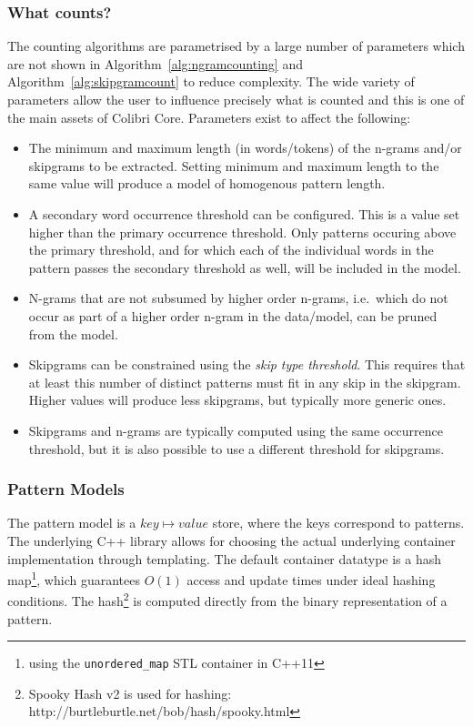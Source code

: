 \documentclass[a4paper,12pt]{article}
\begin{document}
\subsubsection{What counts?}
\label{sec:whatcounts}

The counting algorithms are parametrised by a large number of parameters which
are not shown in Algorithm~\ref{alg:ngramcounting} and
Algorithm~\ref{alg:skipgramcount} to reduce complexity. The wide variety of
parameters allow the user to influence precisely what is counted and this is one
of the main assets of Colibri Core. Parameters exist to affect the following:

\begin{itemize}
    \item The minimum and maximum length (in words/tokens) of the n-grams
        and/or skipgrams to be extracted. Setting minimum and maximum length to
        the same value will produce a model of homogenous pattern length.
    \item A secondary word occurrence threshold can be configured. This is a value set higher than
        the primary occurrence threshold. Only patterns
        occuring above the primary threshold, and for which each of the
        individual words in the pattern passes the secondary threshold as well, will
        be included in the model.
    \item N-grams that are not subsumed by higher order n-grams, i.e.\ which do
        not  occur as part of a higher order n-gram in the data/model, can be pruned
        from the model. 
    \item Skipgrams can be constrained using the \emph{skip type threshold}. This
        requires that at least this number of distinct patterns must fit in any 
        skip in the skipgram. Higher values will produce less skipgrams, but
        typically more generic ones. 
    \item Skipgrams and n-grams are typically computed using the same
        occurrence threshold, but it is also possible to use a different threshold
        for skipgrams.
\end{itemize}

\subsubsection{Pattern Models}

The pattern model is a $key \mapsto value$ store, where the keys correspond to
patterns. The underlying C++ library allows for choosing the actual underlying
container implementation through templating. The default container datatype is
a hash map\footnote{using the \texttt{unordered\_map} STL container in C++11},
which guarantees $O(1)$ access and update times under ideal hashing conditions. The
hash\footnote{Spooky Hash v2 is used for hashing:
http://burtleburtle.net/bob/hash/spooky.html} is computed directly from the
binary representation of a pattern.
\end{document}
